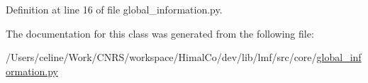Definition at line 16 of file global\+\_\+information.\+py.



The documentation for this class was generated from the following file\+:\begin{DoxyCompactItemize}
\item 
/\+Users/celine/\+Work/\+C\+N\+R\+S/workspace/\+Himal\+Co/dev/lib/lmf/src/core/\hyperlink{global__information_8py}{global\+\_\+information.\+py}\end{DoxyCompactItemize}
